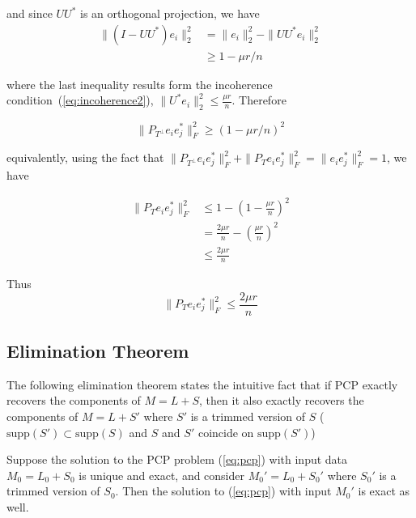 and since $UU^*$ is an orthogonal projection, we have
\begin{align*}
\|(I - UU^*)e_i\|_2^2
&= \|e_i\|_2^2 - \|UU^*e_i\|_2^2 \\
&\geq 1 - \mu r / n
\end{align*}

where the last inequality results form the incoherence condition~(\ref{eq:incoherence2}), $\|U^*e_i\|_2^2 \leq \frac{\mu r}{n}$. Therefore

\begin{equation}
\|P_{T^\perp} e_ie_j^*\|_F^2 \geq (1 - \mu r / n)^2   \label{property: p3}
\end{equation}

equivalently, using the fact that $\|P_{T^\perp} e_ie_j^*\|_F^2 + \|P_{T} e_ie_j^*\|_F^2 = \|e_ie_j^*\|_F^2 = 1$, we have

\begin{align*}
\|P_{T} e_ie_j^*\|_F^2
&\leq 1 - \left(1 - \frac{\mu r}{n} \right)^2 \\
&= \frac{2\mu r}{n} - \left( \frac{\mu r}{n} \right)^2 \\
&\leq \frac{2\mu r}{n}
\end{align*}

Thus
\begin{equation}
  \|P_{T} e_ie_j^*\|_F^2 \leq \frac{2\mu r}{n}   \label{property: p4}
\end{equation}
\subsection{Elimination Theorem}
The following elimination theorem states the intuitive fact that if PCP exactly recovers the components of $M = L+S$, then it also exactly recovers the components of $M = L+S'$ where $S'$ is a trimmed version of $S$ ($\text{supp}(S')\subset \text{supp}(S)$ and $S$ and $S'$ coincide on $\text{supp}(S')$)

\begin{theorem}
Suppose the solution to the PCP problem (\ref{eq:pcp}) with input data $M_0 = L_0 + S_0$ is unique and exact, and consider $M_0' = L_0 + S_0'$ where $S_0'$ is a trimmed version of $S_0$. Then the solution to (\ref{eq:pcp}) with input $M_0'$ is exact as well.
\end{theorem}

